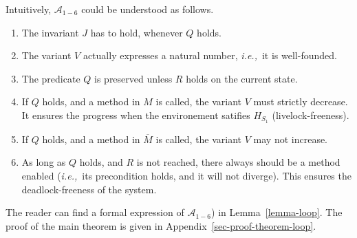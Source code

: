 Intuitively, $\mathcal{A}_{1-6}$ could be understood as follows.
\begin{enumerate}
\item The invariant \(J\) has to hold, whenever \(Q\) holds.
\item The variant $V$ actually expresses a natural number,
\emph{i.e.,}\/~it is well-founded.
\item %
The predicate $Q$ is preserved unless $R$ holds on the current state.
\item If \(Q\) holds, and a method in $M$ is called, the variant \(V\) must
  strictly decrease. It ensures the progress when the environement satifies
  $H_{S_1}$ (livelock-freeness).
\item If \(Q\) holds, and a method in $\overline{M}$ is
  called, the variant \(V\) may not increase.

\item As long as \(Q\) holds, and \(R\) is not reached, there always
should be a method enabled (\emph{i.e.,}\/~its precondition holds, and
it will not diverge). This ensures the deadlock-freeness of the system.

\end{enumerate}
The reader can find a formal expression of $\mathcal{A}_{1-6}$) in
Lemma~\ref{lemma-loop}. The proof of the main theorem is given in
Appendix~\ref{sec-proof-theorem-loop}.







